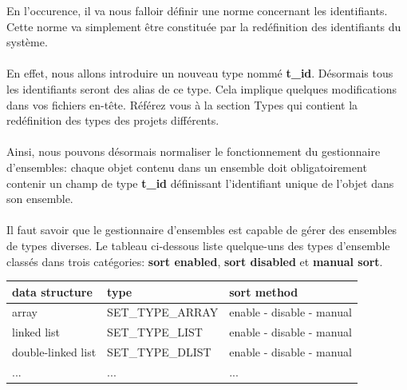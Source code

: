 \documentclass[10pt,a4wide]{article}
\begin{document}
En l'occurence, il va nous falloir d\'efinir une norme concernant les
identifiants. Cette norme va simplement \^etre constitu\'ee par la
red\'efinition des identifiants du syst\`eme.

\paragraph{}

En effet, nous allons introduire un nouveau type nomm\'e \textbf{t\_id}.
D\'esormais tous les identifiants seront des alias de ce type. Cela implique
quelques modifications dans vos fichiers en-t\^ete. R\'ef\'erez vous
\`a la section Types qui contient la red\'efinition des types des projets
diff\'erents.

\paragraph{}

Ainsi, nous pouvons d\'esormais normaliser le fonctionnement du gestionnaire
d'ensembles: chaque objet contenu dans un ensemble doit obligatoirement
contenir un champ de type \textbf{t\_id} d\'efinissant l'identifiant unique
de l'objet dans son ensemble.

\paragraph{}

Il faut savoir que le gestionnaire d'ensembles est capable de g\'erer
des ensembles de types diverses. Le tableau ci-dessous liste quelque-uns
des types d'ensemble class\'es dans trois cat\'egories: \textbf{sort enabled},
\textbf{sort disabled} et \textbf{manual sort}.

\begin{center}

\begin{tabular}{|p{4cm}|p{4cm}|p{5cm}|}

\hline

\textbf{data structure} & \textbf{type} & \textbf{sort method} \\

\hline

array & SET\_TYPE\_ARRAY & enable - disable - manual \\

\hline

linked list & SET\_TYPE\_LIST & enable - disable - manual \\

\hline

double-linked list & SET\_TYPE\_DLIST & enable - disable - manual \\

\hline

... & ... & ... \\

\hline

\end{tabular}

\end{center}
\end{document}
